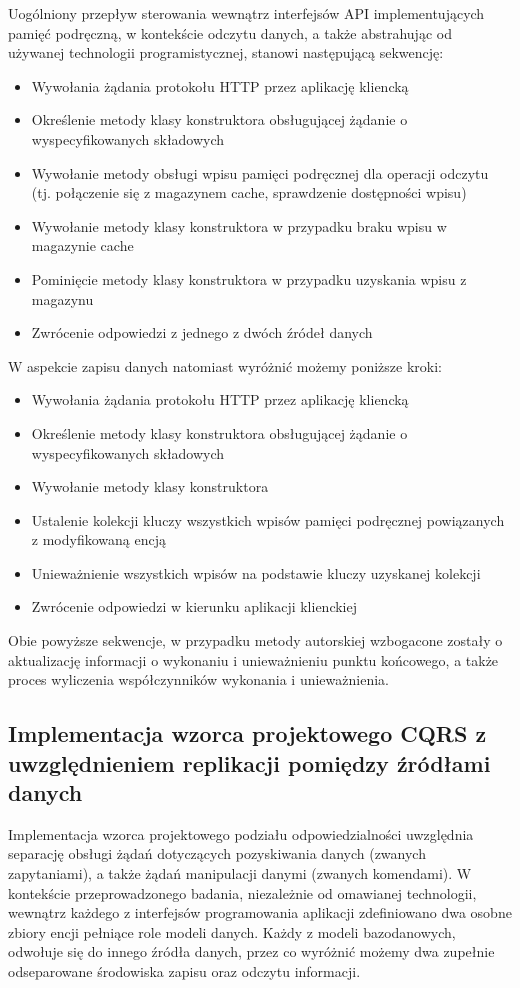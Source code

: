 Uogólniony przepływ sterowania wewnątrz interfejsów API implementujących pamięć podręczną, w kontekście odczytu danych, a także abstrahując od używanej technologii programistycznej, stanowi następującą sekwencję:

\begin{itemize}
    \item Wywołania żądania protokołu HTTP przez aplikację kliencką
    \item Określenie metody klasy konstruktora obsługującej żądanie o wyspecyfikowanych składowych
    \item Wywołanie metody obsługi wpisu pamięci podręcznej dla operacji odczytu (tj. połączenie się z magazynem cache, sprawdzenie dostępności wpisu)
    \item Wywołanie metody klasy konstruktora w przypadku braku wpisu w magazynie cache
    \item Pominięcie metody klasy konstruktora w przypadku uzyskania wpisu z magazynu
    \item Zwrócenie odpowiedzi z jednego z dwóch źródeł danych
\end{itemize}

W aspekcie zapisu danych natomiast wyróżnić możemy poniższe kroki:

\begin{itemize}
    \item Wywołania żądania protokołu HTTP przez aplikację kliencką
    \item Określenie metody klasy konstruktora obsługującej żądanie o wyspecyfikowanych składowych
    \item Wywołanie metody klasy konstruktora
    \item Ustalenie kolekcji kluczy wszystkich wpisów pamięci podręcznej powiązanych z modyfikowaną encją
    \item Unieważnienie wszystkich wpisów na podstawie kluczy uzyskanej kolekcji
    \item Zwrócenie odpowiedzi w kierunku aplikacji klienckiej
\end{itemize}

Obie powyższe sekwencje, w przypadku metody autorskiej wzbogacone zostały o aktualizację informacji o wykonaniu i unieważnieniu punktu końcowego, a także proces wyliczenia współczynników wykonania i unieważnienia. 
\subsection*{Implementacja wzorca projektowego CQRS z uwzględnieniem replikacji pomiędzy źródłami danych}
\label{sec:implementacja-cqrs-i-replikacji}
Implementacja wzorca projektowego podziału odpowiedzialności uwzględnia separację obsługi żądań dotyczących pozyskiwania danych (zwanych zapytaniami), a także żądań manipulacji danymi (zwanych komendami). W kontekście przeprowadzonego badania, niezależnie od omawianej technologii, wewnątrz każdego z interfejsów programowania aplikacji zdefiniowano dwa osobne zbiory encji pełniące role modeli danych. Każdy z modeli bazodanowych, odwołuje się do innego źródła danych, przez co wyróżnić możemy dwa zupełnie odseparowane środowiska zapisu oraz odczytu informacji.


